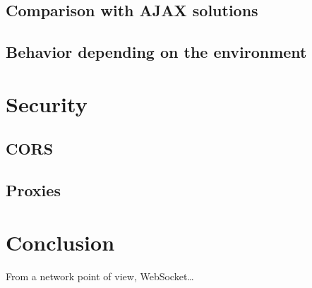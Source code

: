 \documentclass[journal,compsoc]{IEEEtran}
\newcommand{\ws}{WebSocket}
\begin{document}
\subsection{Comparison with AJAX solutions}

\subsection{Behavior depending on the environment}



\section{Security}

\subsection{CORS}

\subsection{Proxies}



\section{Conclusion}

From a network point of view, \ws …


\ifCLASSOPTIONcaptionsoff
  \newpage
\fi




\end{document}
